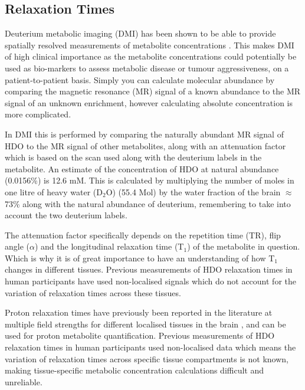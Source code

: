 \documentclass[class=article, crop=false]{standalone}
\begin{document}
\subsection{Relaxation Times}

Deuterium metabolic imaging (DMI) has been shown to be able to provide spatially resolved measurements of metabolite concentrations \cite{Kreis2020MeasuringMRI,Lu2017QuantitativeSpectroscopy}. This makes DMI of high clinical importance as the metabolite concentrations could potentially be used as bio-markers to assess metabolic disease or tumour aggressiveness, on a patient-to-patient basis. Simply you can calculate molecular abundance by comparing the magnetic resonance (MR) signal of a known abundance to the MR signal of an unknown enrichment, however calculating absolute concentration is more complicated. 

In DMI this is performed by comparing the naturally abundant MR signal of HDO to the MR signal of other metabolites, along with an attenuation factor which is based on the scan used along with the deuterium labels in the metabolite. An estimate of the concentration of HDO at natural abundance (0.0156\%) is 12.6 mM. This is calculated by multiplying the number of moles in one litre of heavy water (D$_{2}$O) (55.4 Mol) by the water fraction of the brain $\approx$73\% along with the natural abundance of deuterium, remembering to take into account the two deuterium labels.

The attenuation factor specifically depends on the repetition time (TR), flip angle ($\alpha$) and the longitudinal relaxation time (T$_1$) of the metabolite in question. Which is why it is of great importance to have an understanding of how T$_1$ changes in different tissues. Previous measurements of HDO relaxation times in human participants have used non-localised signals \cite{DeFeyter2018DeuteriumVivo,DeFeyter2021DeuteriumFuture,Ruhm2021DeuteriumResolution} which do not account for the variation of relaxation times across these tissues.

Proton relaxation times have previously been reported in the literature at multiple field strengths for different localised tissues in the brain \cite{Wright2008WaterOptimization}, and can be used for proton metabolite quantification. Previous measurements of HDO relaxation times in human participants used non-localised data \cite{DeFeyter2018DeuteriumVivo, Ruhm2022Dynamic9.4T, Gursan2022ResidualMuscle} which means the variation of relaxation times across specific tissue compartments is not known, making tissue-specific metabolic concentration calculations difficult and unreliable.  
\end{document}
